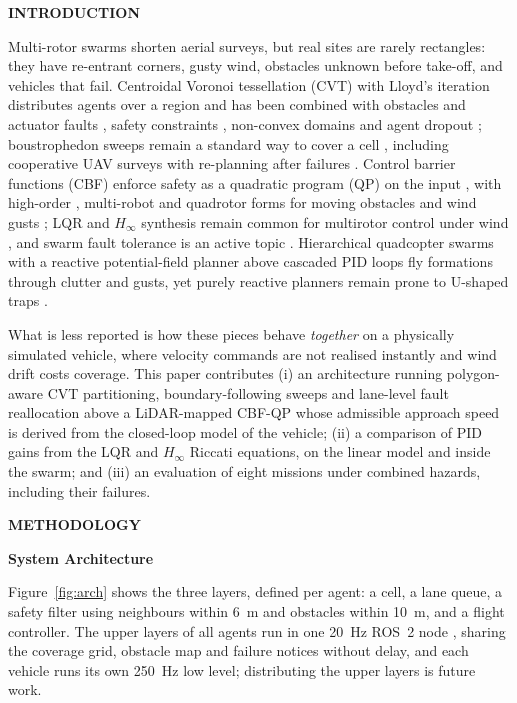 \documentclass[10pt,letterpaper]{article}
\newif\ifafterheadone
\newcommand{\headingone}[1]{\par\addpenalty{-200}\vspace{8pt}%
    {\centering\fontsize{12}{14}\selectfont\bfseries\MakeUppercase{#1}\par}%
    \nopagebreak\vspace{3pt}\nopagebreak\global\afterheadonetrue\noindent\ignorespaces}
\newcommand{\headingtwo}[1]{\par\ifafterheadone\nopagebreak\else\addpenalty{-200}\fi\vspace{6pt}%
    {\centering\fontsize{12}{14}\selectfont\bfseries #1\par}%
    \nopagebreak\vspace{2pt}\nopagebreak\global\afterheadonefalse\noindent\ignorespaces}
\begin{document}
\headingone{Introduction}
Multi-rotor swarms shorten aerial surveys, but real sites are rarely rectangles: they have
re-entrant corners, gusty wind, obstacles unknown before take-off, and vehicles that fail.
Centroidal Voronoi tessellation (CVT) with Lloyd's iteration \cite{lloydLeastSquaresQuantization1982}
distributes agents over a region and has been combined with obstacles and actuator faults
\cite{baiAdaptiveCoverageObstacle2022}, safety constraints \cite{baiSafeAdaptiveCoverage2023},
non-convex domains \cite{caoDistributedWeightedCoverage2023} and agent dropout
\cite{leeAdaptiveCentroidalVoronoi2024}; boustrophedon sweeps remain a standard way to cover a cell
\cite{tanCoveragePathPlanningReview2021,huRoutePlanning2021}, including cooperative UAV surveys
\cite{fevgasCoveragePathPlanningUAV2022} with re-planning after failures
\cite{lunaMultiUAVReplanning2024}. Control barrier functions (CBF) enforce safety as a quadratic
program (QP) on the input \cite{amesControlBarrierFunction2017,hsuSafetyFilter2024}, with
high-order \cite{xiaoHighOrderCBF2022}, multi-robot \cite{gargLearningSafeMultiRobot2024} and
quadrotor forms for moving obstacles \cite{tayalCollisionConeUAV2024} and wind gusts
\cite{abichandaniMultiQuadrotorWind2023}; LQR and $H_\infty$ synthesis \cite{doyleStateSpaceHinf1989} remain common for multirotor
control under wind \cite{zyadatQuadplaneWind2023}, and swarm fault
tolerance is an active topic \cite{okeeffeAnticipatingDegradation2025}. Hierarchical quadcopter
swarms with a reactive potential-field planner above cascaded PID loops fly formations through
clutter and gusts, yet purely reactive planners remain prone to U-shaped traps
\cite{herdianFormationIAPFERC2026}.

What is less reported is how these pieces behave \emph{together} on a physically simulated
vehicle, where velocity commands are not realised instantly and wind drift costs coverage. This
paper contributes (i) an architecture running polygon-aware CVT partitioning, boundary-following
sweeps and lane-level fault reallocation above a LiDAR-mapped CBF-QP whose admissible approach
speed is derived from the closed-loop model of the vehicle; (ii) a comparison of PID gains
from the LQR and $H_\infty$ Riccati equations, on the linear model and inside the swarm; and
(iii) an evaluation of eight missions under combined hazards, including their failures.

\headingone{Methodology}

\headingtwo{System Architecture}
Figure~\ref{fig:arch} shows the three layers, defined per agent: a cell, a lane queue, a safety
filter using neighbours within 6~m and obstacles within 10~m, and a flight controller. The upper
layers of all agents run in one 20~Hz ROS~2 node \cite{macenskiROS2_2022}, sharing the coverage
grid, obstacle map and failure notices without delay, and each vehicle runs its own 250~Hz low
level; distributing the upper layers is future work.
\end{document}
